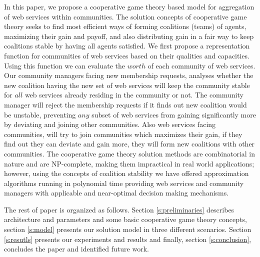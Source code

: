 \documentclass[10pt, conference, compsocconf]{IEEEtran}
\theoremstyle{plain}
\theoremstyle{definition}
\begin{document}
In this paper, we propose a cooperative game theory based model for aggregation of web services within communities. The solution concepts of cooperative game theory seeks to find most efficient ways of forming coalitions (teams) of agents, maximizing their gain and payoff, and also distributing gain in a fair way to keep coalitions stable by having all agents satisfied. We first propose a representation function for communities of web services based on their qualities and capacities. Using this function we can evaluate the $worth$ of each community of web services. Our community managers facing new membership requests, analyses whether the new coalition having the new set of web services will keep the community stable for $all$ web services already residing in the community or not. The community manager will reject the membership requests if it finds out new coalition would be unstable, preventing $any$ subset of web services from gaining significantly more by deviating and joining other communities. Also web services facing communities, will try to join communities which maximizes their gain, if they find out they can deviate and gain more, they will form new coalitions with other communities. The cooperative game theory solution methods are combinatorial in nature and are NP-complete, making them impractical in real world applications; however, using the concepts of coalition stability we have offered approximation algorithms running in polynomial time providing web services and community managers with applicable and near-optimal decision making mechanisms.

The rest of paper is organized as follows. Section \ref{s:preliminaries} describes architecture and parameters and some basic cooperative game theory concepts, section \ref{s:model} presents our solution model in three different scenarios. Section \ref{s:resutls} presents our experiments and results and finally, section \ref{s:conclusion}, concludes the paper and identified future work.



\end{document}
